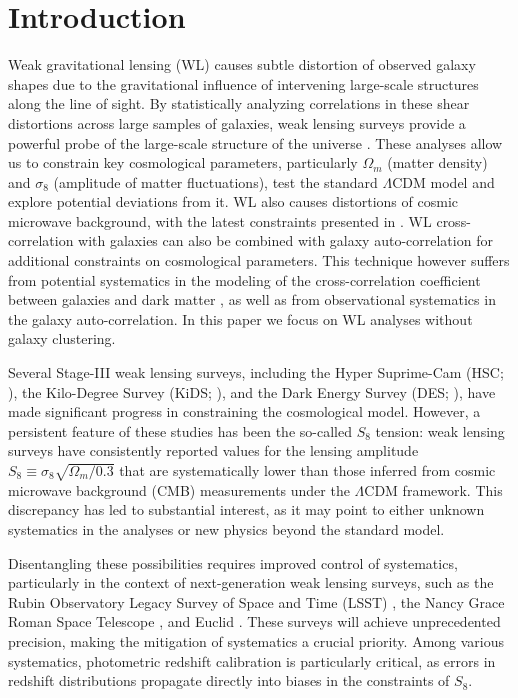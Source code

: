 \section{Introduction}
\label{sec:intro}
Weak gravitational lensing (WL) causes subtle distortion of observed galaxy shapes due to the gravitational influence of intervening large-scale structures along the line of sight. By statistically analyzing correlations in these shear distortions across large samples of galaxies, weak lensing surveys provide a powerful probe of the large-scale structure of the universe \citep{Bartelmann_2001, Kilbinger_2015}. These analyses allow us to constrain key cosmological parameters, particularly $\Omega_m$ (matter density) and $\sigma_8$ (amplitude of matter fluctuations), test the standard $\Lambda$CDM model and explore potential deviations from it. WL also causes distortions of cosmic microwave background, with the latest constraints presented in \cite{Qu2025_ACTSPTPLANCK_CMBL_S8}. WL cross-correlation with galaxies can also be combined with galaxy auto-correlation for additional 
constraints on cosmological parameters.
This technique however suffers from potential systematics in the modeling of the cross-correlation coefficient between galaxies and dark matter \cite{Guzik01}, as well as from 
observational systematics 
 in the galaxy auto-correlation. In 
this paper we focus on WL analyses without 
galaxy clustering. 

Several Stage-III weak lensing surveys, including the Hyper Suprime-Cam (HSC; \cite{Dalal2023CosmoShearHSC, Li2023_HSCY3_CosmicShear}), the Kilo-Degree Survey (KiDS; \cite{Wright2025_KiDSLegacy}), and the Dark Energy Survey (DES; \cite{DESY3Amon,DESY3Secco}), have made significant progress in constraining the cosmological model. However, a persistent feature of these studies has been the so-called $S_8$ tension: weak lensing surveys have consistently reported values for the lensing amplitude $S_8\equiv\sigma_8\sqrt{\Omega_m/0.3}$ that are systematically lower than those inferred from cosmic microwave background (CMB) measurements \cite{Planck2018_CMB} under the $\Lambda$CDM framework. This discrepancy has led to substantial interest, as it may point to either unknown systematics in the analyses or new physics beyond the standard model. 

Disentangling these possibilities requires improved control of systematics, particularly in the context of next-generation weak lensing surveys, such as the Rubin Observatory Legacy Survey of Space and Time (LSST) \citep{LSST2019survey}, the Nancy Grace Roman Space Telescope \citep{roman2019wfirst}, and Euclid \citep{EuclidOverview}. These surveys will achieve unprecedented precision, making the mitigation of systematics a crucial priority. Among various systematics, photometric redshift calibration is particularly critical, as errors in redshift distributions propagate directly into biases in the constraints of $S_8$.

